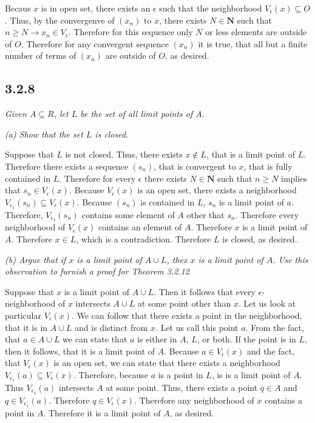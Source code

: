\documentclass[11pt,oneside,titlepage]{book}
\begin{document}
Becaus $x$ is in open set, there exists an $\epsilon$ such that the neighborhood $V_\epsilon (x) \subseteq O$. Thus, by the convergenve of $(x_n)$ to $x$,
there
exists $N \in \textbf{N}$ such that $n \geq N \to x_n \in V_\epsilon$.
Therefore for this sequence only $N$ or less elements are outside of $O$.
Therefore for any convergent sequence $(x_n)$ it is true, that all but a finite
number of terms of $(x_n)$ are outside of $O$, as desired.

\subsection*{3.2.8}
\textit{Given $A \subseteq R$, let $L$ be the set of all limit points of
  $A$.}

\textit{(a) Show that the set $L$ is closed.}

Suppose that $L$ is not closed. Thus, there exists $x \notin L$, that is a
limit point of $L$. Therefore there exists a sequence $(s_n)$, that is
convergent to $x$, that is fully contained in $L$. Therefore for
every $\epsilon$ there exists $N \in \textbf{N}$ such that $n \geq N$ implies
that $s_n \in  V_\epsilon(x)$. Because $V_\epsilon(x)$ is an open set, there
exists a neighborhood $V_{\epsilon_1}(s_n) \subseteq V_\epsilon(x)$.
Because $(s_n)$ is contained in $L$, $s_n$ is a limit point of $a$. Therefore,
$V_{\epsilon_1}(s_n)$ contains some element of $A$ other that $s_n$.
Therefore every neighborhood of $V_\epsilon(x)$ contains an element of $A$.
Therefore $x$ is a limit point of $A$. Therefore $x \in L$, which is a
contradiction. Therefore $L$ is closed, as desired.

\textit{(b) Argue that if $x$ is a limit point of $A \cup L$, thex $x$ is a
  limit point of $A$. Use this observation to furnish a proof for
  Theorem 3.2.12}

Suppose that $x$ is a limit point of $A \cup L$. Then it follows that every
$\epsilon$-neighborhood of $x$ intersects $A \cup L$ at some point other than $x$. Let us look at particular  $V_\epsilon(x)$.
We can follow that there exists a point in the neighborhood,
that it is in $A \cup L$ and  is distinct from $x$. Let us call this point  $a$.
From the fact, that $a \in A \cup L$ we can state that $a$ is either in $A$,
$L$, or both.
If the point is in $L$, then it follows, that it is a limit point of $A$.
Because $a \in V_\epsilon(x)$ and the fact, that $V_\epsilon(x)$ is an open set,
we can state that there exists a neighborhood
$V_{\epsilon_1}(a) \subseteq V_\epsilon(x)$. Therefore, because $a$ is a point
in $L$, is is a limit point of $A$. Thus $V_{\epsilon_1}(a)$ intersects $A$ at
some point. Thus, there exists a point $q \in A$ and $q \in V_{\epsilon_1}(a)$.
Therefore $q \in V_\epsilon(x)$. Therefore any neighborhood of $x$ contains a
point in $A$. Therefore it is a limit point of $A$, as desired.
\end{document}
